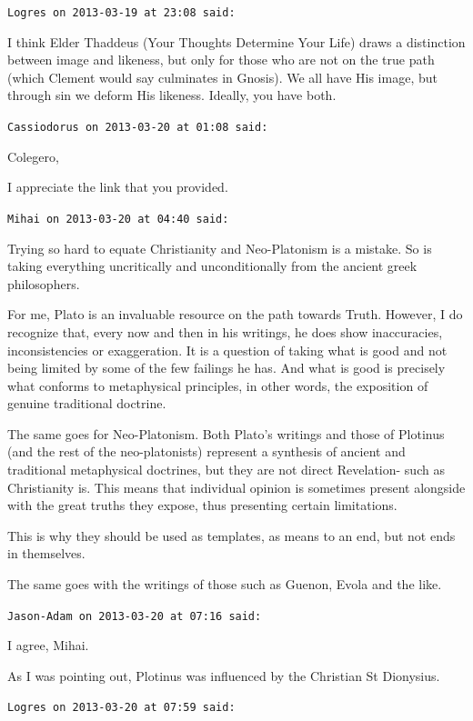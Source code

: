 \begin{footnotesize}
\begin{sffamily}
\texttt{Logres on 2013-03-19 at 23:08 said:}

I think Elder Thaddeus (Your Thoughts Determine Your Life) draws a distinction between image and likeness, but only for those who are not on the true path (which Clement would say culminates in Gnosis). We all have His image, but through sin we deform His likeness. Ideally, you have both.

\hfill

\texttt{Cassiodorus on 2013-03-20 at 01:08 said:}

Colegero,

I appreciate the link that you provided.

\hfill

\texttt{Mihai on 2013-03-20 at 04:40 said:}

Trying so hard to equate Christianity and Neo-Platonism is a mistake. So is taking everything uncritically and unconditionally from the ancient greek philosophers.

For me, Plato is an invaluable resource on the path towards Truth. However, I do recognize that, every now and then in his writings, he does show inaccuracies, inconsistencies or exaggeration. It is a question of taking what is good and not being limited by some of the few failings he has. And what is good is precisely what conforms to metaphysical principles, in other words, the exposition of genuine traditional doctrine.

The same goes for Neo-Platonism. Both Plato's writings and those of Plotinus (and the rest of the neo-platonists) represent a synthesis of ancient and traditional metaphysical doctrines, but they are not direct Revelation- such as Christianity is. This means that individual opinion is sometimes present alongside with the great truths they expose, thus presenting certain limitations.

This is why they should be used as templates, as means to an end, but not ends in themselves.

The same goes with the writings of those such as Guenon, Evola and the like.

\hfill

\texttt{Jason-Adam on 2013-03-20 at 07:16 said:}

I agree, Mihai.

As I was pointing out, Plotinus was influenced by the Christian St Dionysius.

\hfill

\texttt{Logres on 2013-03-20 at 07:59 said:}


\end{sffamily}
\end{footnotesize}
